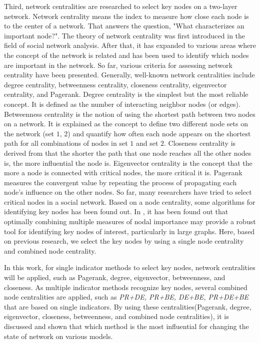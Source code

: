 Third, network centralities are researched to select key nodes on a two-layer network. Network centrality means the index to measure how close each node is to the center of a network. That answers the question, "What characterizes an important node?". The theory of network centrality was first introduced in the field of social network analysis\parencite{freeman1979}. After that, it has expanded to various areas where the concept of the network is related and has been used to identify which nodes are important in the network. So far, various criteria for assessing network centrality have been presented. Generally, well-known network centralities include degree centrality, betweenness centrality, closeness centrality, eigenvector centrality, and Pagerank\parencite{koschutzki2008, francisco2018, bianconi2018}. Degree centrality is the simplest but the most reliable concept. It is defined as the number of interacting neighbor nodes (or edges).  Betweenness centrality is the notion of using the shortest path between two nodes on a network. It is explained as the concept to define two different node sets on the network (set $1$, $2$) and quantify how often each node appears on the shortest path for all combinations of nodes in set $1$ and set $2$. Closeness centrality is derived from that the shorter the path that one node reaches all the other nodes is, the more influential the node is. Eigenvector centrality is the concept that the more a node is connected with critical nodes, the more critical it is. Pagerank measures the convergent value by repeating the process of propagating each node's influence on the other nodes.
So far, many researchers have tried to select critical nodes in a social network\parencite{eom2015, white2003, mesgari2015, hwang1981, huang2014}. Based on a node centrality, some algorithms for identifying key nodes has been found out. In \parencite{mesgari2015, huang2014}, it has been found out that optimally combining multiple measures of nodal importance may provide a robust tool for identifying key nodes of interest, particularly in large graphs. Here, based on previous research, we select the key nodes by using a single node centrality and combined node centrality.

In this work, for single indicator methods to select key nodes, network centralities will be applied, such as Pagerank, degree, eigenvector, betweenness, and closeness. As multiple indicator methods recognize key nodes, several combined node centralities are applied, such as \textit{PR+DE, PR+BE, DE+BE, PR+DE+BE} that are based on single indicators.  By using these centralities(Pagerank, degree, eigenvector, closeness, betweenness, and combined node centralities), it is discussed and shown that which method is the most influential for changing the state of network on various models.\\  

